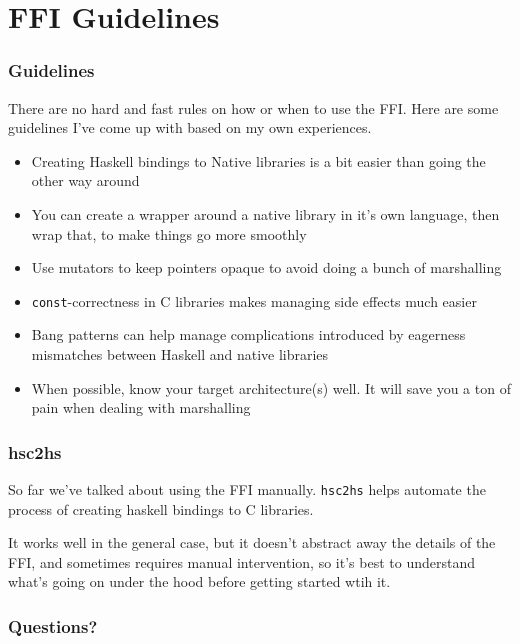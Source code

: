 \documentclass{beamer}
\begin{document}
\section{FFI Guidelines}
\begin{frame}
    \frametitle{Guidelines}
    There are no hard and fast rules on how or when to use the FFI.  Here are
    some guidelines I've come up with based on my own experiences.

    \begin{itemize}
        \item{Creating Haskell bindings to Native libraries is a bit easier than
            going the other way around}

        \item{You can create a wrapper around a native library in it's own
            language, then wrap that, to make things go more smoothly}

        \item{Use mutators to keep pointers opaque to avoid doing a bunch of
            marshalling}

        \item{{\tt const}-correctness in C libraries makes managing side effects
            much easier}

        \item{Bang patterns can help manage complications introduced by
            eagerness mismatches between Haskell and native libraries}
            
        \item{When possible, know your target architecture(s) well.  It will
            save you a ton of pain when dealing with marshalling}
    \end{itemize}
\end{frame}
\begin{frame}
    \frametitle{hsc2hs}
    So far we've talked about using the FFI manually. {\tt hsc2hs} helps
    automate the process of creating haskell bindings to C libraries.
    
    It works well in the general case, but it doesn't abstract away the details
    of the FFI, and sometimes requires manual intervention, so it's best to
    understand what's going on under the hood before getting started wtih it.
\end{frame}
\begin{frame}
    \frametitle{Questions?}
\end{frame}
\end{document}
